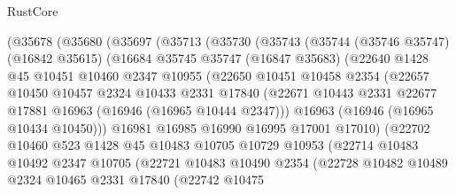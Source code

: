 \begin{lexlean}{RustCore}
\begin{coremodule}
        (@35678
          (@35680
            (@35697
              (@35713
                (@35730
                  (@35743
                    (@35744
                      (@35746 @35747)
                      (@16842 @35615)
                      (@16684
                        @35745
                        @35747
                        (@16847 @35683)
                        (@22640
                          @1428
                          @45
                          @10451
                          @10460
                          @2347
                          @10955
                          (@22650
                            @10451
                            @10458
                            @2354
                            (@22657
                              @10450
                              @10457
                              @2324
                              @10433
                              @2331
                              @17840
                              (@22671
                                @10443
                                @2331
                                @22677
                                @17881
                                @16963
                                (@16946 (@16965 @10444 @2347)))
                              @16963
                              (@16946 (@16965 @10434 @10450)))
                            @16981
                            @16985
                            @16990
                            @16995
                            @17001
                            @17010)
                          (@22702
                            @10460
                            @523
                            @1428
                            @45
                            @10483
                            @10705
                            @10729
                            @10953
                            (@22714
                              @10483
                              @10492
                              @2347
                              @10705
                              (@22721
                                @10483
                                @10490
                                @2354
                                (@22728
                                  @10482
                                  @10489
                                  @2324
                                  @10465
                                  @2331
                                  @17840
                                  (@22742
                                    @10475

\end{coremodule}
\end{lexlean}
